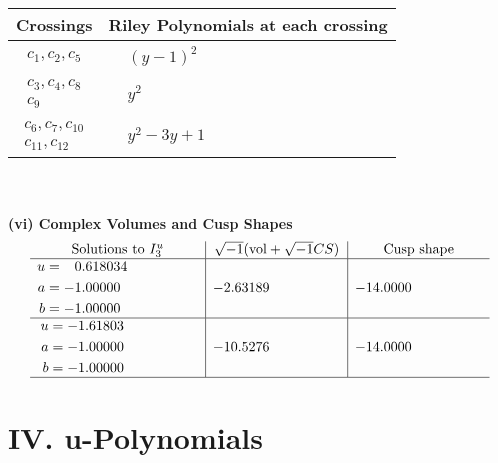 \documentclass[1p]{elsarticle_modified}
\theoremstyle{definition}
\newcommand{\I}{\sqrt{-1}}
\begin{document}
\begin{tabular}{m{50pt}|m{274pt}}
Crossings & \hspace{64pt}Riley Polynomials at each crossing \\
\hline $$\begin{aligned}c_{1},c_{2},c_{5}\end{aligned}$$&$\begin{aligned}
&(y-1)^2
\end{aligned}$\\
\hline $$\begin{aligned}c_{3},c_{4},c_{8}\\c_{9}\end{aligned}$$&$\begin{aligned}
&y^2
\end{aligned}$\\
\hline $$\begin{aligned}c_{6},c_{7},c_{10}\\c_{11},c_{12}\end{aligned}$$&$\begin{aligned}
&y^2-3 y+1
\end{aligned}$\\
\hline
\end{tabular}\\~\\
\newpage\flushleft \textbf{(vi) Complex Volumes and Cusp Shapes}
$$\begin{array}{c|c|c}  
\text{Solutions to }I^u_{3}& \I (\text{vol} + \sqrt{-1}CS) & \text{Cusp shape}\\
 \hline 
\begin{aligned}
u &= \phantom{-}0.618034\phantom{ +0.000000I} \\
a &= -1.00000\phantom{ +0.000000I} \\
b &= -1.00000\phantom{ +0.000000I}\end{aligned}
 & -2.63189\phantom{ +0.000000I} & -14.0000\phantom{ +0.000000I} \\ \hline\begin{aligned}
u &= -1.61803\phantom{ +0.000000I} \\
a &= -1.00000\phantom{ +0.000000I} \\
b &= -1.00000\phantom{ +0.000000I}\end{aligned}
 & -10.5276\phantom{ +0.000000I} & -14.0000\phantom{ +0.000000I}\\
 \hline 
 \end{array}$$\newpage
\newpage\renewcommand{\arraystretch}{1}
\centering \section*{ IV. u-Polynomials}
\end{document}
